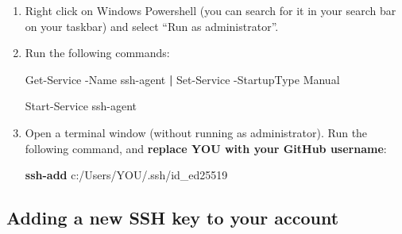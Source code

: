 \documentclass[
]{book}
\newenvironment{Shaded}{\begin{snugshade}}{\end{snugshade}}
\newcommand{\AttributeTok}[1]{\textcolor[rgb]{0.13,0.29,0.53}{#1}}
\newcommand{\ExtensionTok}[1]{#1}
\newcommand{\FunctionTok}[1]{\textcolor[rgb]{0.13,0.29,0.53}{\textbf{#1}}}
\newcommand{\KeywordTok}[1]{\textcolor[rgb]{0.13,0.29,0.53}{\textbf{#1}}}
\newcommand{\NormalTok}[1]{#1}
\theoremstyle{definition}
\theoremstyle{definition}
\theoremstyle{definition}
\theoremstyle{definition}
\theoremstyle{remark}
\begin{document}
\begin{enumerate}
\def\labelenumi{\arabic{enumi}.}
\item
  Right click on Windows Powershell (you can search for it in your search bar on your taskbar) and select ``Run as administrator''.
\item
  Run the following commands:

\begin{Shaded}
\begin{Highlighting}[]
\ExtensionTok{Get{-}Service} \AttributeTok{{-}Name}\NormalTok{ ssh{-}agent }\KeywordTok{|} \ExtensionTok{Set{-}Service} \AttributeTok{{-}StartupType}\NormalTok{ Manual}
\end{Highlighting}
\end{Shaded}

\begin{Shaded}
\begin{Highlighting}[]
\ExtensionTok{Start{-}Service}\NormalTok{ ssh{-}agent}
\end{Highlighting}
\end{Shaded}
\item
  Open a terminal window (without running as administrator). Run the following command, and \textbf{replace YOU with your GitHub username}:

\begin{Shaded}
\begin{Highlighting}[]
\FunctionTok{ssh{-}add}\NormalTok{ c:/Users/YOU/.ssh/id\_ed25519}
\end{Highlighting}
\end{Shaded}
\end{enumerate}

\subsection{Adding a new SSH key to your account}\label{adding-a-new-ssh-key-to-your-account}
\end{document}
